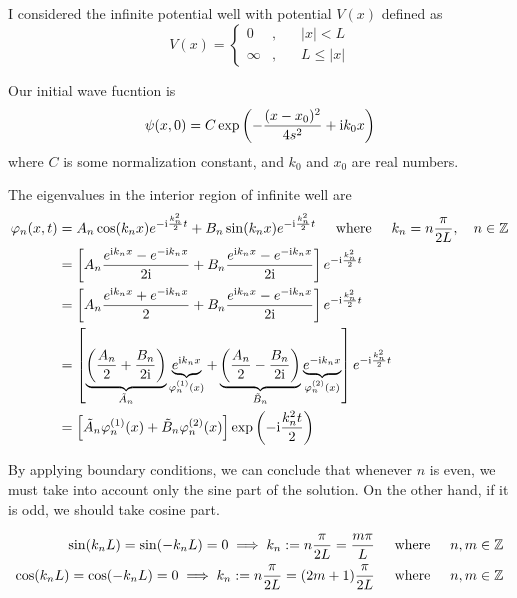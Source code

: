 \documentclass[12pt]{article}
\begin{document}
I considered the infinite potential well with potential $V(x)$ defined as \begin{equation}
V(x) = \left\{\begin{matrix}
0 & ,&\quad |x| < L \\ \infty & ,& \quad  L \leq |x| 
\end{matrix}\right.
\end{equation}

Our initial wave fucntion is\begin{equation}
\psi(x,0) = C \exp\left(-\frac{(x-x_0)^2}{4s^2} + \mathrm i k_0 x\right)
\end{equation}
where $C$ is some normalization constant, and $k_0$ and $x_0$ are real numbers.

The eigenvalues in the interior region of infinite well are\begin{align}
\varphi_n(x , t) &= A_n \cos(k_nx)e^{-\mathrm i \frac{k_n^2}{2} t} + B_n\sin(k_nx) e^{-\mathrm i \frac{k_n^2}{2} t} \hspace{5mm}\text{where}\hspace{5mm} k_n = n\frac{\pi}{2L},\quad n \in \mathbb{Z} \\
& = \left[A_n \frac{e^{\mathrm i k_nx}- e^{-\mathrm i k_n x} }{2\mathrm i}+ B_n \frac{e^{\mathrm i k_nx}- e^{-\mathrm i k_n x} }{2\mathrm i} \right]e^{-\mathrm i \frac{k_n^2}{2} t} \\ 
& = \left[A_n \frac{e^{\mathrm i k_nx}+e^{-\mathrm i k_n x} }{2}+ B_n \frac{e^{\mathrm i k_nx}- e^{-\mathrm i k_n x} }{2\mathrm i} \right]e^{-\mathrm i \frac{k_n^2}{2} t} \\ 
& = \left[\underbrace{\left(\frac{A_n}{2}+\frac{B_n}{2\mathrm i}\right)}_{\tilde A_n} \underbrace{e^{\mathrm i k_nx}}_{\varphi_n^{(1)}(x)} + \underbrace{\left(\frac{A_n}{2}-\frac{B_n}{2\mathrm i}\right)}_{\tilde B_n} \underbrace{e^{-\mathrm i k_nx}}_{\varphi_n^{(2)}(x)} \right]e^{-\mathrm i \frac{k_n^2}{2} t} \\ 
& = \left[\tilde A_n \varphi_n^{(1)}(x) + \tilde B_n \varphi_n^{(2)}(x)\right] \exp\left(- \mathrm i \frac{k_n^2t}{2}\right)
\end{align}

By applying boundary conditions, we can conclude that whenever $n$ is even, we must take into account only the sine part of the solution. On the other hand, if it is odd, we should take cosine part.

\begin{align}
\sin(k_nL) = \sin(-k_nL) = 0 \implies k_n := n\frac{\pi}{2L} = \frac{m\pi}{L}\hspace{5mm}\text{where}\hspace{5mm} n,m\in \mathbb Z \\ 
\cos(k_nL) = \cos(-k_nL) = 0 \implies k_n := n\frac{\pi}{2L} = (2m+1)\frac{\pi}{2L} \hspace{5mm}\text{where}\hspace{5mm} n,m\in \mathbb Z
\end{align}
\end{document}
